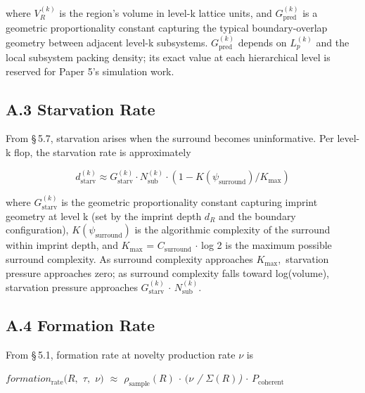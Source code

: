 \documentclass[11pt,oneside]{report}
\theoremstyle{definition}
\theoremstyle{remark}
\begin{document}
where \ensuremath{V_{R}^{(k)}} is the region's volume in level-k lattice units, and
\ensuremath{G_{\mathrm{pred}}^{(k)}} is a geometric proportionality constant capturing the
typical boundary-overlap geometry between adjacent level-k subsystems.
\ensuremath{G_{\mathrm{pred}}^{(k)}} depends on \ensuremath{L_{p}^{(k)}} and the local subsystem packing
density; its exact value at each hierarchical level is reserved for
Paper 5's simulation work.

\subsection*{A.3 Starvation Rate}

From \S\,5.7, starvation arises when the surround becomes uninformative.
Per level-k flop, the starvation rate is approximately

\begin{equation*}
d_{\mathrm{starv}}^{(k)} \approx G_{\mathrm{starv}}^{(k)} \cdot N_{\mathrm{sub}}^{(k)} \cdot (1 -
K(\psi_{\mathrm{surround}})/K_{\mathrm{max}})
\end{equation*}

where \ensuremath{G_{\mathrm{starv}}^{(k)}} is the geometric proportionality constant
capturing imprint geometry at level k (set by the imprint depth \ensuremath{d_{R}} and
the boundary configuration), \ensuremath{K(\psi_{\mathrm{surround}})} is the algorithmic
complexity of the surround within imprint depth, and \ensuremath{K_{\mathrm{max}}} =
\textbar \ensuremath{C_{\mathrm{surround}}}\textbar{} \ensuremath{\cdot} log 2 is the maximum possible surround
complexity. As surround complexity approaches \ensuremath{K_{\mathrm{max}},} starvation
pressure approaches zero; as surround complexity falls toward
log(volume), starvation pressure approaches \ensuremath{G_{\mathrm{starv}}^{(k)}} \ensuremath{\cdot}
\ensuremath{N_{\mathrm{sub}}^{(k)}.}

\subsection*{A.4 Formation Rate}

From \S\,5.1, formation rate at novelty production rate \ensuremath{\nu} is

\emph{\ensuremath{formation_{\mathrm{rate}}(R,} \ensuremath{\tau ,} \ensuremath{\nu )} \ensuremath{\approx} \ensuremath{\rho_{\mathrm{sample}}(R)} \ensuremath{\cdot} \ensuremath{(\nu} /
\textbar \ensuremath{\Sigma (R)}\textbar) \ensuremath{\cdot} \ensuremath{P_{\mathrm{coherent}}}}
\end{document}
